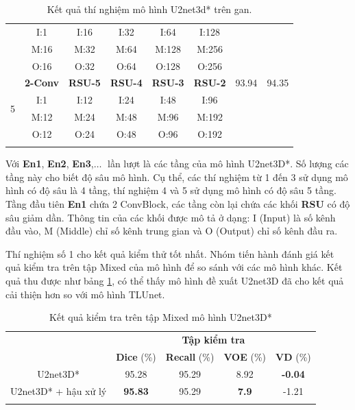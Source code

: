 \begin{table}[H]
{\begin{tabular}{c|c c c c c | c c}
                                      & I:1  & I:16 & I:32 & I:64  & I:128 \\ 
                                      & M:16 & M:32 & M:64 & M:128 & M:256 \\
                                      & O:16 & O:32 & O:64 & O:128 & O:256 \\
        \hline
        \multirow{4}{*}{5} & \textbf{2-Conv} & \textbf{RSU-5} & \textbf{RSU-4} & \textbf{RSU-3} &  \textbf{RSU-2}  & 93.94 & 94.35 \\
                                      & I:1  & I:12 & I:24 & I:48  & I:96 \\ 
                                      & M:12 & M:24 & M:48 & M:96 & M:192 \\
                                      & O:12 & O:24 & O:48 & O:96 & O:192 \\
    \Xhline{3\arrayrulewidth}
    \end{tabular}}
    \caption{Kết quả thí nghiệm mô hình U2net3d* trên gan.}
\end{table}
\vspace{-5mm}
Với \textbf{En1}, \textbf{En2}, \textbf{En3},$\ldots\;$ lần lượt là các tầng của mô hình U2net3D*. Số lượng các tầng này cho biết độ sâu mô hình. Cụ thể, các thí nghiệm từ 1 đến 3 sử dụng mô hình có độ sâu là 4 tầng, thí nghiệm 4 và 5 sử dụng mô hình có độ sâu 5 tầng. Tầng đầu tiên \textbf{En1} chứa 2 ConvBlock, các tầng còn lại chứa các khối \textbf{RSU} có độ sâu giảm dần. Thông tin của các khối được mô tả ở dạng: I (Input) là số kênh đầu vào, M (Middle) chỉ số kênh trung gian và O (Output) chỉ số kênh đầu ra.\par
Thí nghiệm số 1 cho kết quả kiểm thử tốt nhất. Nhóm tiến hành đánh giá kết quả kiểm tra trên tập Mixed của mô hình để so sánh với các mô hình khác. Kết quả thu được như bảng \ref{tabel:result_liver}, có thể thấy mô hình đề xuất U2net3D đã cho kết quả cải thiện hơn so với mô hình TLUnet.

\begin{table}[H]
    \renewcommand{\arraystretch}{1.1}
    \centering
    \begin{tabular}{c|c|c|c|c}
    \Xhline{3\arrayrulewidth}
    \multirow{2}{*}{\textbf{Thí nghiệm}} & \multicolumn{4}{c}{\textbf{Tập kiểm tra}}                             \\ \cline{2-5} 
                                         & \textbf{Dice} (\%) & \textbf{Recall} (\%) & \textbf{VOE} (\%) & \textbf{VD} (\%) \\ \hline
    U2net3D*                            & 95.28     & 95.29     & 8.92     & \textbf{-0.04}    \\ \hline
    U2net3D* + hậu xử lý             & \textbf{95.83}       & 95.29     & \textbf{7.9}   & -1.21      \\ 
    \Xhline{3\arrayrulewidth}
    \end{tabular}
    \caption{Kết quả kiểm tra trên tập Mixed mô hình U2net3D*}
    \label{tabel:result_liver}
\end{table}

